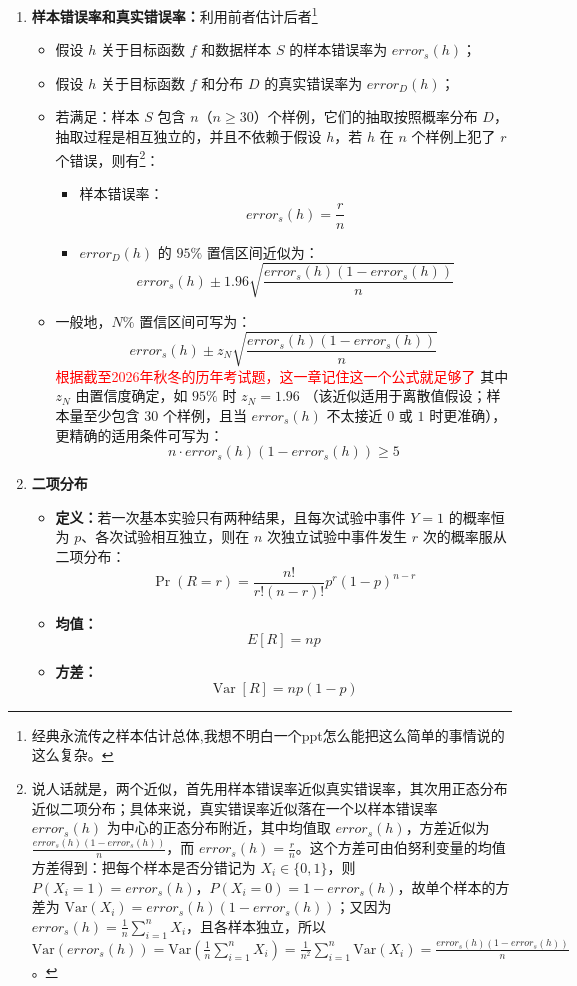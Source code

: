 \documentclass[../main.tex]{subfiles}
\begin{document}
\begin{enumerate}
    \item \textbf{样本错误率和真实错误率：}利用前者估计后者\footnote{经典永流传之样本估计总体,我想不明白一个ppt怎么能把这么简单的事情说的这么复杂。}
    \begin{itemize}
        \item 假设 $h$ 关于目标函数 $f$ 和数据样本 $S$ 的样本错误率为 $error_s(h)$；
        \item 假设 $h$ 关于目标函数 $f$ 和分布 $D$ 的真实错误率为 $error_D(h)$；
        \item 若满足：样本 $S$ 包含 $n$（$n\geq 30$）个样例，它们的抽取按照概率分布 $D$，抽取过程是相互独立的，并且不依赖于假设 $h$，若 $h$ 在 $n$ 个样例上犯了 $r$ 个错误，则有\footnote{说人话就是，两个近似，首先用样本错误率近似真实错误率，其次用正态分布近似二项分布；具体来说，真实错误率近似落在一个以样本错误率 $error_s(h)$ 为中心的正态分布附近，其中均值取 $error_s(h)$，方差近似为 $\frac{error_s(h)(1-error_s(h))}{n}$，而 $error_s(h)=\frac{r}{n}$。这个方差可由伯努利变量的均值方差得到：把每个样本是否分错记为 $X_i\in\{0,1\}$，则 $P(X_i=1)=error_s(h)$，$P(X_i=0)=1-error_s(h)$，故单个样本的方差为 $\mathrm{Var}(X_i)=error_s(h)(1-error_s(h))$；又因为 $error_s(h)=\frac{1}{n}\sum_{i=1}^n X_i$，且各样本独立，所以 $\mathrm{Var}(error_s(h))=\mathrm{Var}\!\left(\frac{1}{n}\sum_{i=1}^n X_i\right)=\frac{1}{n^2}\sum_{i=1}^n \mathrm{Var}(X_i)=\frac{error_s(h)(1-error_s(h))}{n}$。}：
        \begin{itemize}
            \item 样本错误率：
            $$
            error_s(h)=\frac{r}{n}
            $$
        
            \item $error_D(h)$ 的 $95\%$ 置信区间近似为：
            $$
            error_s(h)\pm 1.96\sqrt{\frac{error_s(h)\left(1-error_s(h)\right)}{n}}
            $$
        \end{itemize}
        \item 一般地，$N\%$ 置信区间可写为：
        $$
        error_s(h)\pm z_N\sqrt{\frac{error_s(h)\left(1-error_s(h)\right)}{n}}
        $$
        \textcolor{red}{根据截至2026年秋冬的历年考试题，这一章记住这一个公式就足够了}
        其中 $z_N$ 由置信度确定，如 $95\%$ 时 $z_N=1.96$ （该近似适用于离散值假设；样本量至少包含 $30$ 个样例，且当 $error_s(h)$ 不太接近 $0$ 或 $1$ 时更准确），更精确的适用条件可写为：
        $$
        n\cdot error_s(h)\left(1-error_s(h)\right)\geq 5
        $$
    \end{itemize}
    \item \textbf{二项分布}
    \begin{itemize}
        \item \textbf{定义：}若一次基本实验只有两种结果，且每次试验中事件 $Y=1$ 的概率恒为 $p$、各次试验相互独立，则在 $n$ 次独立试验中事件发生 $r$ 次的概率服从二项分布：
        $$
        \Pr(R=r)=\frac{n!}{r!(n-r)!}p^r(1-p)^{n-r}
        $$
        \item \textbf{均值：}
        $$
        E[R]=np
        $$
        \item \textbf{方差：}
        $$
        \operatorname{Var}[R]=np(1-p)
        $$
    \end{itemize}


\end{enumerate}
\end{document}
